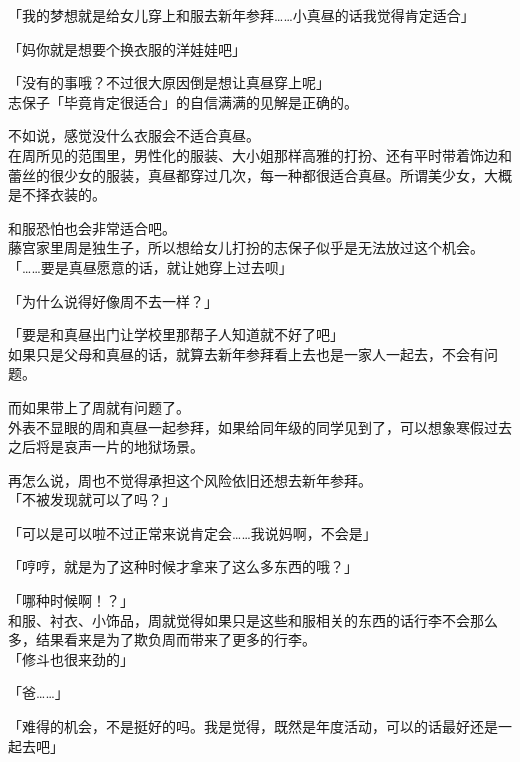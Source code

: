 「我的梦想就是给女儿穿上和服去新年参拜……小真昼的话我觉得肯定适合」

「妈你就是想要个换衣服的洋娃娃吧」

「没有的事哦？不过很大原因倒是想让真昼穿上呢」\\

志保子「毕竟肯定很适合」的自信满满的见解是正确的。

不如说，感觉没什么衣服会不适合真昼。\\

在周所见的范围里，男性化的服装、大小姐那样高雅的打扮、还有平时带着饰边和蕾丝的很少女的服装，真昼都穿过几次，每一种都很适合真昼。所谓美少女，大概是不择衣装的。

和服恐怕也会非常适合吧。\\

藤宫家里周是独生子，所以想给女儿打扮的志保子似乎是无法放过这个机会。\\

「……要是真昼愿意的话，就让她穿上过去呗」

「为什么说得好像周不去一样？」

「要是和真昼出门让学校里那帮子人知道就不好了吧」\\

如果只是父母和真昼的话，就算去新年参拜看上去也是一家人一起去，不会有问题。

而如果带上了周就有问题了。\\

外表不显眼的周和真昼一起参拜，如果给同年级的同学见到了，可以想象寒假过去之后将是哀声一片的地狱场景。

再怎么说，周也不觉得承担这个风险依旧还想去新年参拜。\\

「不被发现就可以了吗？」

「可以是可以啦不过正常来说肯定会……我说妈啊，不会是」

「哼哼，就是为了这种时候才拿来了这么多东西的哦？」

「哪种时候啊！？」\\

和服、衬衣、小饰品，周就觉得如果只是这些和服相关的东西的话行李不会那么多，结果看来是为了欺负周而带来了更多的行李。\\

「修斗也很来劲的」

「爸……」

「难得的机会，不是挺好的吗。我是觉得，既然是年度活动，可以的话最好还是一起去吧」\\

